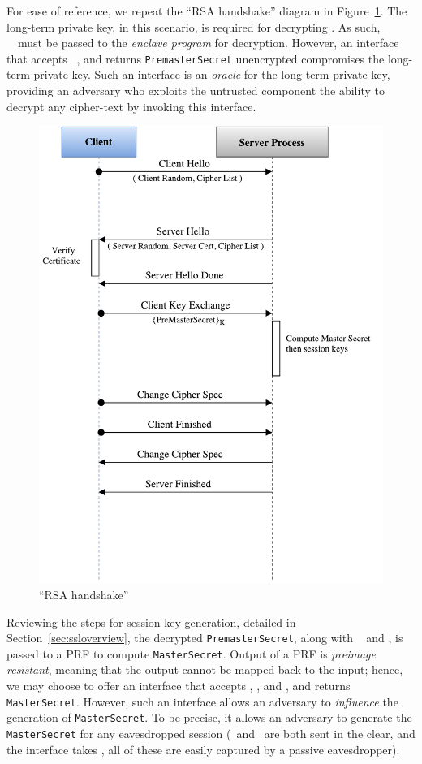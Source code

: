 \documentclass[../../main.tex]{subfiles}
\begin{document}
For ease of reference, we repeat the ``RSA handshake'' diagram in
Figure~\ref{fig:rsa-handshake-repeat}. The long-term private key, in
this scenario, is required for decrypting \premaster. As such,
~\premaster~must be passed to the \textit{enclave program} for
decryption. However, an interface that accepts ~\premaster, and
returns \texttt{PremasterSecret} unencrypted compromises the long-term
private key. Such an interface is an \textit{oracle} for the long-term
private key, providing an adversary who exploits the untrusted
component the ability to decrypt any cipher-text by invoking this
interface.

\begin{figure}[H]
  \centering
  \includegraphics[scale=0.4]{images/rsa-handshake-pristine.pdf}
  \caption{``RSA handshake''}
  \label{fig:rsa-handshake-repeat}
\end{figure}

Reviewing the steps for session key generation, detailed in
Section~\ref{sec:ssloverview}, the decrypted \texttt{PremasterSecret},
along with \crandom~ and \srandom, is passed to a PRF to compute
\texttt{MasterSecret}. Output of a PRF is \textit{preimage resistant},
meaning that the output cannot be mapped back to the input; hence, we
may choose to offer an interface that accepts \crandom, \srandom, and
\premaster, and returns \texttt{MasterSecret}. However, such an
interface allows an adversary to \textit{influence} the generation of
\texttt{MasterSecret}. To be precise, it allows an adversary to
generate the \texttt{MasterSecret} for any eavesdropped session
(\srandom~and \crandom~are both sent in the clear, and the interface
takes \premaster, all of these are easily captured by a passive
eavesdropper).
\end{document}

